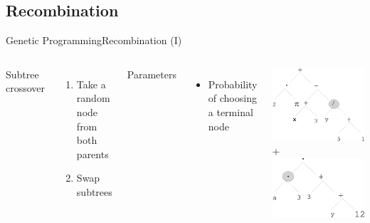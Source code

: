 \documentclass[10pt,compress]{beamer} %
\begin{document}
\subsection{Recombination}

\begin{frame}[fragile]{Genetic Programming}{Recombination (I)}
    \begin{columns}
			Subtree crossover
			\begin{enumerate}
				\item Take a random node from both parents
				\item Swap subtrees
			\end{enumerate}
			Parameters
			\begin{itemize}
				\item Probability of choosing a terminal node
			\end{itemize}

    		\begin{columns}
					\includegraphics[width=\linewidth]{figs/gpparentacrossover.eps} 
					+
					\includegraphics[width=\linewidth]{figs/gpparentbcrossover.eps}
			\end{columns}


\end{columns}
\end{frame}
\end{document}
